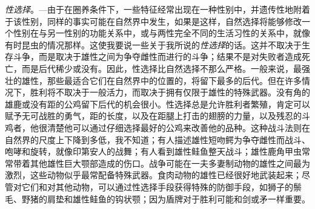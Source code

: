 \documentclass{article}
\begin{document}
\textit{性选择}。—由于在圈养条件下，一些特征经常出现在一种性别中，并遗传性地附着于该性别，同样的事实可能在自然界中发生，如果是这样，自然选择将能够修改一个性别在与另一性别的功能关系中，或与两性完全不同的生活习性的关系中，就像有时昆虫的情况那样。这使我要说一些关于我所说的\textit{性选择}的话。这并不取决于生存斗争，而是取决于雄性之间为争夺雌性而进行的斗争；结果不是对失败者造成死亡，而是后代稀少或没有。因此，性选择比自然选择不那么严格。一般来说，最强壮的雄性，那些最适合它们在自然界中的位置的，将留下最多的后代。但在许多情况下，胜利将不取决于一般活力，而取决于拥有仅限于雄性的特殊武器。没有角的雄鹿或没有距的公鸡留下后代的机会很小。性选择总是允许胜利者繁殖，肯定可以赋予无可战胜的勇气，距的长度，以及在距腿上打击的翅膀的力量，以及残忍的斗鸡者，他很清楚他可以通过仔细选择最好的公鸡来改善他的品种。这种战斗法则在自然界的尺度上下降到多低，我不知道；有人描述雄性短吻鳄为争夺雌性而战斗、咆哮和旋转，就像印第安人的战舞；有人看到雄性鲑鱼整天战斗；雄性鹿角甲虫常常带着其他雄性巨大颚部造成的伤口。战争可能在一夫多妻制动物的雄性之间最为激烈，这些动物似乎最常配备特殊武器。食肉动物的雄性已经很好地武装起来；尽管对它们和对其他动物，可以通过性选择手段获得特殊的防御手段，如狮子的鬃毛、野猪的肩垫和雄性鲑鱼的钩状颚；因为盾牌对于胜利可能和剑或矛一样重要。\\
\end{document}
